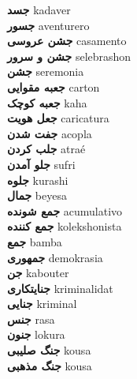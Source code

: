 \textbf{ جسد  } kadaver \\
\textbf{ جسور  } aventurero \\
\textbf{ جشن عروسی  } casamento \\
\textbf{ جشن و سرور  } selebrashon \\
\textbf{ جشن  } seremonia \\
\textbf{ جعبه مقوایی  } carton \\
\textbf{ جعبه کوچک  } kaha \\
\textbf{ جعل هویت  } caricatura \\
\textbf{ جفت شدن  } acopla \\
\textbf{ جلب کردن  } atraé \\
\textbf{ جلو آمدن  } sufri \\
\textbf{ جلوه  } kurashi \\
\textbf{ جمال  } beyesa \\
\textbf{ جمع شونده  } acumulativo \\
\textbf{ جمع کننده  } kolekshonista \\
\textbf{ جمع  } bamba \\
\textbf{ جمهوری  } demokrasia \\
\textbf{ جن  } kabouter \\
\textbf{ جنایتکاری  } kriminalidat \\
\textbf{ جنایی  } kriminal \\
\textbf{ جنس  } rasa \\
\textbf{ جنون  } lokura \\
\textbf{ جنگ صلیبی  } kousa \\
\textbf{ جنگ مذهبی  } kousa \\
